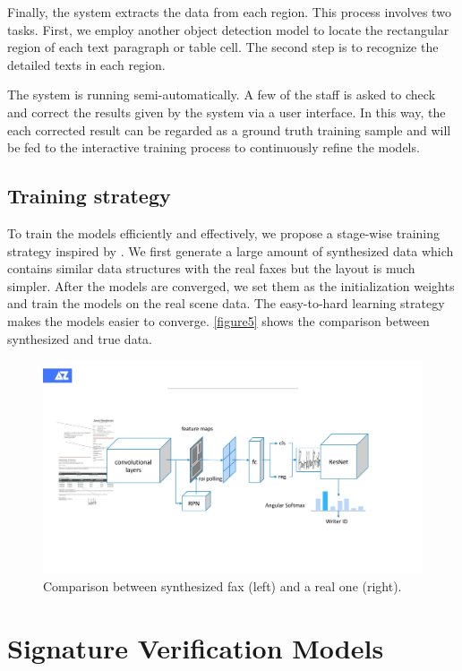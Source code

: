 \documentclass[sigconf]{acmart}
\begin{document}
Finally, the system extracts the data from each region. This process involves two tasks. First, we employ another object detection model to locate the rectangular region of each text paragraph or table cell. The second step is to recognize the detailed texts in each region.

The system is running semi-automatically. A few of the staff is asked to check and correct the results given by the system via a user interface. In this way, the each corrected result can be regarded as a ground truth training sample and will be fed to the interactive training process to continuously refine the models.

\subsection{Training strategy}
To train the models efficiently and effectively, we propose a stage-wise training strategy inspired by \cite{bengio2009curriculum}. We first generate a large amount of synthesized data which contains similar data structures with the real faxes but the layout is much simpler. After the models are converged, we set them as the initialization weights and train the models on the real scene data. The easy-to-hard learning strategy makes the models easier to converge. \ref{figure5} shows the comparison between synthesized and true data.

\begin{figure}[h]
	\centering
	\includegraphics[width=\linewidth]{figure3}
	\caption{Comparison between synthesized fax (left) and a real one (right). }
	\label{figure3}
\end{figure}



\section{Signature Verification Models}
\end{document}
